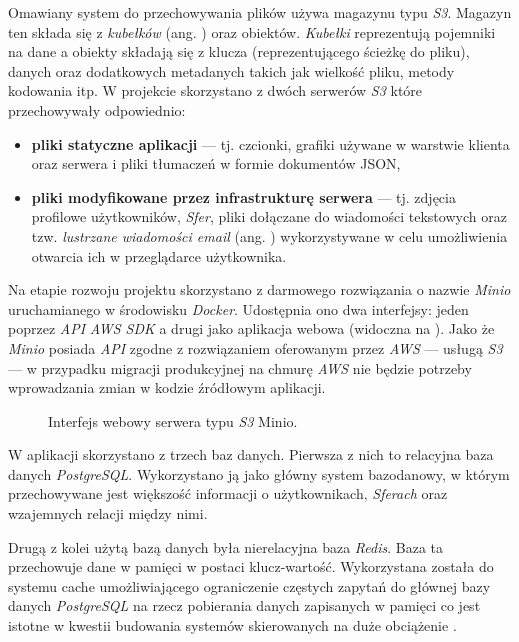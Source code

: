 
Omawiany system do przechowywania plików używa magazynu typu \textit{S3}. Magazyn ten składa się z \textit{kubełków}
(ang. ) oraz obiektów. \textit{Kubełki} reprezentują pojemniki na dane a obiekty składają się z klucza
(reprezentującego ścieżkę do pliku), danych oraz dodatkowych metadanych takich jak wielkość pliku, metody kodowania itp.
W projekcie skorzystano z dwóch serwerów \textit{S3} które przechowywały odpowiednio:
%
\begin{itemize}
  \item \textbf{pliki statyczne aplikacji} — tj. czcionki, grafiki używane w warstwie klienta oraz serwera i pliki
        tłumaczeń w formie dokumentów JSON,
  \item \textbf{pliki modyfikowane przez infrastrukturę serwera} — tj. zdjęcia profilowe użytkowników, \textit{Sfer},
        pliki dołączane do wiadomości tekstowych oraz tzw. \textit{lustrzane wiadomości email} (ang. ) wykorzystywane w celu umożliwienia otwarcia ich w przeglądarce użytkownika.
\end{itemize}

Na etapie rozwoju projektu skorzystano z darmowego rozwiązania o nazwie \textit{Minio} uruchamianego w środowisku
\textit{Docker}. Udostępnia ono dwa interfejsy: jeden poprzez \textit{API} \textit{AWS SDK} a drugi jako aplikacja
webowa (widoczna na ). Jako że \textit{Minio} posiada \textit{API} zgodne z rozwiązaniem
oferowanym przez \textit{AWS} — usługą \textit{S3} — w przypadku migracji produkcyjnej na chmurę \textit{AWS} nie będzie
potrzeby wprowadzania zmian w kodzie źródłowym aplikacji.
%
\begin{figure}[H]
  \centering
  \caption{Interfejs webowy serwera typu \textit{S3} Minio.}
  \label{fig:minio-interface}
\end{figure}


W aplikacji skorzystano z trzech baz danych. Pierwsza z nich to relacyjna baza danych \textit{PostgreSQL}. Wykorzystano
ją jako główny system bazodanowy, w którym przechowywane jest większość informacji o użytkownikach, \textit{Sferach}
oraz wzajemnych relacji między nimi.

Drugą z kolei użytą bazą danych była nierelacyjna baza \textit{Redis}. Baza ta przechowuje dane w pamięci w postaci
klucz-wartość. Wykorzystana została do systemu cache umożliwiającego ograniczenie częstych zapytań do głównej bazy
danych \textit{PostgreSQL} na rzecz pobierania danych zapisanych w pamięci co jest istotne w kwestii budowania systemów
skierowanych na duże obciążenie \cite{bib:redis}.

